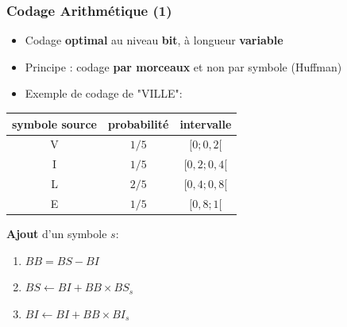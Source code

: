 \documentclass{beamer}
\begin{document}
\begin{frame}
    \frametitle{Codage Arithmétique (1)}

    \begin{itemize}
        \item Codage \textbf{optimal} au niveau \textbf{bit}, à longueur \textbf{variable}
        \item Principe : codage \textbf{par morceaux} et non par symbole (Huffman)
        \item Exemple de codage de "VILLE":
    \end{itemize}

    \vspace*{1em}
    
    {
    \centering
    \begin{tabular}{c | c | c}
        symbole source & probabilité & intervalle  \\
        \hline
        V & $1/5$ & $[0; 0,2[$ \\ 
        I & $1/5$ & $[0,2; 0,4[$\\
        L & $2/5$ & $[0,4; 0,8[$\\
        E & $1/5$ & $[0,8; 1[$\\ \hline
    \end{tabular}\par
    }

    \vspace*{1em}

    \textbf{Ajout} d'un symbole $s$: \\
    \begin{enumerate}
        \item $BB = BS - BI$
        \item $BS \leftarrow BI + BB \times BS_s$
        \item $BI \leftarrow BI + BB \times BI_s$
    \end{enumerate}

\end{frame}
\end{document}
